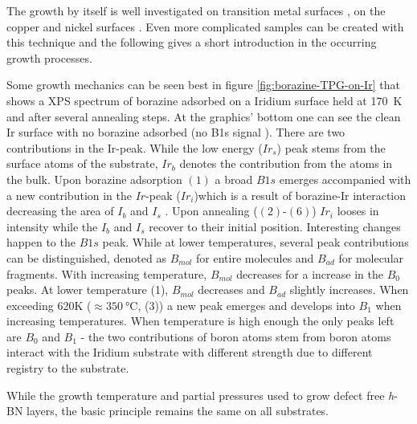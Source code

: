 %	
	The growth by itself is well investigated on transition metal surfaces \cite{gomez_diaz_hexagonal_2013,morscher_formation_2006}, on the copper and nickel surfaces \cite{preobrajenski_monolayer_2005,joshi_boron_2012}. Even more complicated samples can be created with this technique \cite{roth_chemical_2013} and the following gives a short introduction in the occurring growth processes.
	
	Some growth mechanics can be seen best in figure \ref{fig:borazine-TPG-on-Ir} that shows a XPS spectrum of borazine adsorbed on a Iridium surface held at \SI{170}{\kelvin} and after several annealing steps. At the graphics' bottom one can see the clean Ir surface with no borazine adsorbed (no B1s signal ). There are two contributions in the Ir-peak. While the low energy ($Ir_s$) peak stems from the surface atoms of the substrate, $Ir_b$ denotes the contribution from the atoms in the bulk. Upon borazine adsorption $(1)$ a broad $B1s$ emerges accompanied with a new contribution in the $Ir$-peak ($Ir_i$)which is a result of borazine-Ir interaction decreasing the area of $I_b$ and $I_s$ .
	Upon annealing ($(2)$-$(6)$) $Ir_i$ looses in intensity while the $I_b$ and $I_s$ recover to their initial position. Interesting changes happen to the $B1s$ peak. While at lower temperatures, several peak contributions can be distinguished, denoted as $B_{mol}$ for entire molecules and $B_{ad}$ for molecular fragments. With increasing temperature, $B_{mol}$ decreases for a increase in the $B_0$ peaks. At lower temperature (1), $B_{mol}$ decreases and $B_{ad}$ slightly increases. When exceeding 620K ($\approx \SI{350}{\celsius}$, (3)) a new peak emerges and develops into $B_1$ when increasing temperatures. When temperature is high enough the only peaks left are $B_0$ and $B_1$ - the two contributions of boron atoms stem from boron atoms interact with the Iridium substrate with different strength due to different registry to the substrate.
	
	While the growth temperature and partial pressures used to grow defect free \textit{h}-BN layers, the basic principle remains the same on all substrates.


